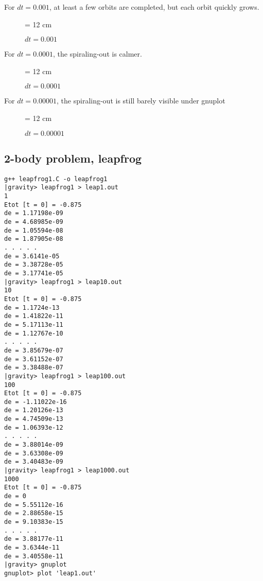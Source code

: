 For $dt = 0.001$, at least a few orbits are completed, but each orbit
quickly grows.

\begin{figure}
\begin{center}
\leavevmode
\epsfxsize = 12 cm
\caption{$dt = 0.001$}
\label{fig:for10}
\end{center}
\end{figure}

For $dt = 0.0001$, the spiraling-out is calmer.

\begin{figure}
\begin{center}
\leavevmode
\epsfxsize = 12 cm
\caption{$dt = 0.0001$}
\label{fig:for100}
\end{center}
\end{figure}

For $dt = 0.00001$, the spiraling-out is still barely visible under gnuplot

\begin{figure}
\begin{center}
\leavevmode
\epsfxsize = 12 cm
\caption{$dt = 0.00001$}
\label{fig:for1000}
\end{center}
\end{figure}

\subsection{2-body problem, leapfrog}



\begin{verbatim}
g++ leapfrog1.C -o leapfrog1
|gravity> leapfrog1 > leap1.out
1
Etot [t = 0] = -0.875
de = 1.17198e-09
de = 4.68985e-09
de = 1.05594e-08
de = 1.87905e-08
. . . . .
de = 3.6141e-05
de = 3.38728e-05
de = 3.17741e-05
|gravity> leapfrog1 > leap10.out
10
Etot [t = 0] = -0.875
de = 1.1724e-13
de = 1.41822e-11
de = 5.17113e-11
de = 1.12767e-10
. . . . .
de = 3.85679e-07
de = 3.61152e-07
de = 3.38488e-07
|gravity> leapfrog1 > leap100.out
100
Etot [t = 0] = -0.875
de = -1.11022e-16
de = 1.20126e-13
de = 4.74509e-13
de = 1.06393e-12
. . . . .
de = 3.88014e-09
de = 3.63308e-09
de = 3.40483e-09
|gravity> leapfrog1 > leap1000.out
1000
Etot [t = 0] = -0.875
de = 0
de = 5.55112e-16
de = 2.88658e-15
de = 9.10383e-15
. . . . .
de = 3.88177e-11
de = 3.6344e-11
de = 3.40558e-11
|gravity> gnuplot
gnuplot> plot 'leap1.out'
\end{verbatim}

